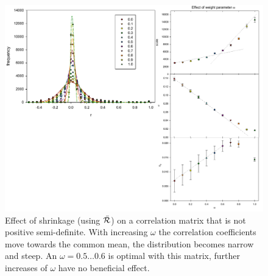 \begin{figure}
   \caption{Effect of shrinkage (using \(\bar{\mathcal{R}} \)) on a correlation matrix that is not positive semi-definite. With increasing \(\omega \) the correlation coefficients move towards the common mean, the distribution becomes narrow and steep. An \(\omega = 0.5\ldots 0.6 \) is optimal with this matrix, further increases of \(\omega \) have no beneficial effect.}
   \label{fig:shrink1}
   \centering
      \includegraphics[width=\textwidth]{Graphics/Effect-omega-on-r}
\end{figure}

